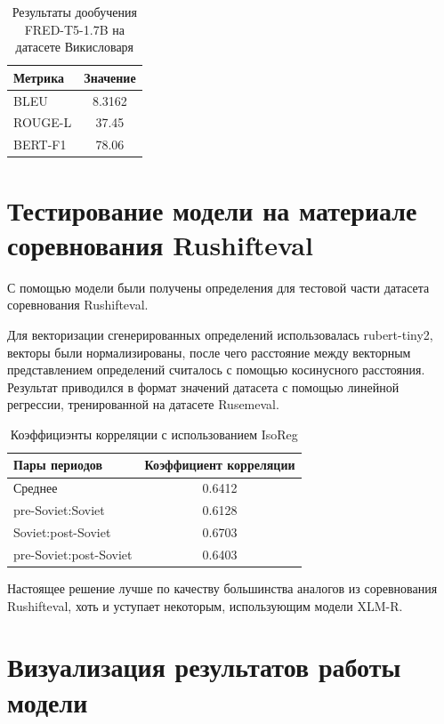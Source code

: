\documentclass[LI,VKR]{HSEUniversity}
\begin{document}
\begin{table}[htbp]
\centering
\caption{Результаты дообучения FRED-T5-1.7B на датасете Викисловаря}
\begin{tabular}{lc}
\hline
Метрика                  & Значение \\
\hline
BLEU            & 8.3162                  \\
ROUGE-L           & 37.45                  \\
BERT-F1          & 78.06                  \\
\hline
\end{tabular}
\end{table}

\section{Тестирование модели на материале соревнования Rushifteval}

С помощью модели были получены определения для тестовой части датасета соревнования Rushifteval.

Для векторизации сгенерированных определений использовалась rubert-tiny2,
векторы были нормализированы, после чего расстояние между
векторным представлением определений считалось с помощью косинусного расстояния.
Результат приводился в формат значений датасета с помощью линейной регрессии,
тренированной на датасете Rusemeval.

\begin{table}[htbp]
\centering
\caption{Коэффициэнты корреляции с использованием IsoReg}
\begin{tabular}{lc}
\hline
Пары периодов                  & Коэффициент корреляции \\
\hline
Среднее            & 0.6412                  \\
pre-Soviet:Soviet           & 0.6128                  \\
Soviet:post-Soviet          & 0.6703                  \\
pre-Soviet:post-Soviet      & 0.6403                  \\
\hline
\end{tabular}
\end{table}

Настоящее решение лучше по качеству большинства аналогов из соревнования Rushifteval,
хоть и уступает некоторым, использующим модели XLM-R.

\section{Визуализация результатов работы модели}
\end{document}
